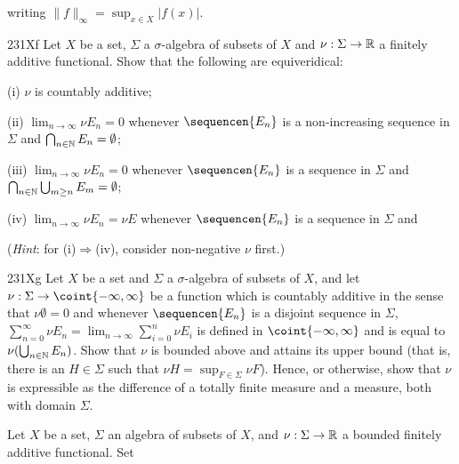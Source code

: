 {\noindent writing $\|f\|_{\infty}=\sup_{x\in X}|f(x)|$. 
      
\sqheader 231Xf Let $X$ be a set, $\Sigma$ a $\sigma$-algebra of 
subsets of $X$ and $\nu:\Sigma\to \Bbb R$ a finitely additive 
functional.   Show that the following are equiveridical: 
      
\quad (i) $\nu$ is countably additive; 
      
\quad (ii) $\lim_{n\to\infty}\nu E_n=0$ whenever $\sequencen{E_n}$ is a 
non-increasing sequence in $\Sigma$ and 
$\bigcap_{n\in\Bbb N}E_n=\emptyset$; 
      
\quad (iii) $\lim_{n\to\infty}\nu E_n=0$ whenever $\sequencen{E_n}$ is a 
sequence in $\Sigma$ and 
$\bigcap_{n\in\Bbb N}\bigcup_{m\ge n}E_m=\emptyset$; 
      
\quad (iv) $\lim_{n\to\infty}\nu E_n=\nu E$ whenever $\sequencen{E_n}$ 
is a sequence in $\Sigma$ and 
      
      
\noindent({\it Hint}:  for (i)$\Rightarrow$(iv), consider non-negative 
$\nu$ first.) 
      
\spheader 231Xg Let $X$ be a set and $\Sigma$ a $\sigma$-algebra 
of subsets of 
$X$, and let $\nu:\Sigma\to\coint{-\infty,\infty}$ be a function which 
is countably additive in the sense that $\nu\emptyset=0$ and whenever 
$\sequencen{E_n}$ is a disjoint sequence in $\Sigma$, 
$\sum_{n=0}^{\infty}\nu E_n=\lim_{n\to\infty}\sum_{i=0}^n\nu E_i$ is 
defined in $\coint{-\infty,\infty}$ and is 
equal to $\nu(\bigcup_{n\in\Bbb N}E_n)$.   Show that $\nu$ is bounded 
above and attains its upper bound (that is, there is an $H\in\Sigma$ 
such that $\nu H=\sup_{F\in\Sigma}\nu F$).   Hence, or otherwise, show 
that $\nu$ is expressible as the difference of a totally finite measure 
and a measure, both with domain $\Sigma$. 
      
 Let $X$ be a set, $\Sigma$ an 
algebra of subsets of $X$, and $\nu:\Sigma\to\Bbb R$ a bounded finitely 
additive 
functional.   Set 
      
      
      
      
}
